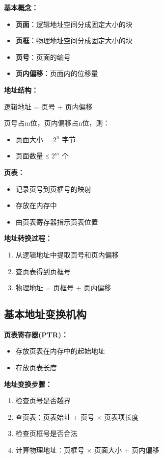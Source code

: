 \documentclass[lang=cn,newtx,10pt,scheme=chinese]{../../elegantbook}
\begin{document}
\textbf{基本概念：}
\begin{itemize}
  \item \textbf{页面}：逻辑地址空间分成固定大小的块
  \item \textbf{页框}：物理地址空间分成固定大小的块
  \item \textbf{页号}：页面的编号
  \item \textbf{页内偏移}：页面内的位移量
\end{itemize}

\textbf{地址结构：}
\begin{center}
逻辑地址 = 页号 + 页内偏移
\end{center}

页号占m位，页内偏移占n位，则：
\begin{itemize}
  \item 页面大小 = $2^n$ 字节
  \item 页面数量 ≤ $2^m$ 个
\end{itemize}

\textbf{页表：}
\begin{itemize}
  \item 记录页号到页框号的映射
  \item 存放在内存中
  \item 由页表寄存器指示页表位置
\end{itemize}

\textbf{地址转换过程：}
\begin{enumerate}
  \item 从逻辑地址中提取页号和页内偏移
  \item 查页表得到页框号
  \item 物理地址 = 页框号 + 页内偏移
\end{enumerate}

\subsection{基本地址变换机构}

\textbf{页表寄存器(PTR)：}
\begin{itemize}
  \item 存放页表在内存中的起始地址
  \item 存放页表长度
\end{itemize}

\textbf{地址变换步骤：}
\begin{enumerate}
  \item 检查页号是否越界
  \item 查页表：页表始址 + 页号 × 页表项长度
  \item 检查页框号是否合法
  \item 计算物理地址：页框号 × 页面大小 + 页内偏移
\end{enumerate}
\end{document}
